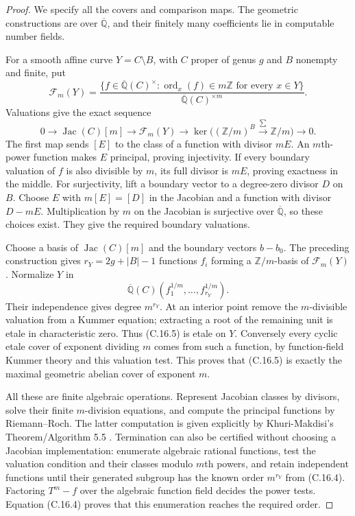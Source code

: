 \begin{proof}
We specify all the covers and comparison maps.
The geometric constructions are over
$\overline{\mathbb Q}$, and their finitely many
coefficients lie in computable number fields.

For a smooth affine curve $Y=C\setminus B$, with $C$
proper of genus $g$ and $B$ nonempty and finite, put
\[
 \mathcal F_m(Y)=
 \frac{\{f\in\overline{\mathbb Q}(C)^\times:
       \operatorname{ord}_x(f)\in m\mathbb Z
                         \text{ for every }x\in Y\}}
      {\overline{\mathbb Q}(C)^{\times m}}.                 \tag{C.16.3}
\]
Valuations give the exact sequence
\[
 0\longrightarrow\operatorname{Jac}(C)[m]
 \longrightarrow\mathcal F_m(Y)
 \longrightarrow
 \ker\bigl((\mathbb Z/m)^B\xrightarrow{\sum}\mathbb Z/m\bigr)
 \longrightarrow0.                                       \tag{C.16.4}
\]
The first map sends $[E]$ to the class of a function
with divisor $mE$.  An $m$th-power function makes
$E$ principal, proving injectivity.  If every boundary
valuation of $f$ is also divisible by $m$, its full
divisor is $mE$, proving exactness in the middle.
For surjectivity, lift a boundary vector to a degree-zero
divisor $D$ on $B$.  Choose $E$ with $m[E]=[D]$ in
the Jacobian and a function with divisor $D-mE$.
Multiplication by $m$ on the Jacobian is surjective
over $\overline{\mathbb Q}$, so these choices exist.
They give the required boundary valuations.

Choose a basis of $\operatorname{Jac}(C)[m]$ and the
boundary vectors $b-b_0$.  The preceding construction
gives $r_Y=2g+|B|-1$ functions $f_i$ forming a
$\mathbb Z/m$-basis of $\mathcal F_m(Y)$.  Normalize
$Y$ in
\[
 \overline{\mathbb Q}(C)
       (f_1^{1/m},\ldots,f_{r_Y}^{1/m}).                    \tag{C.16.5}
\]
Their independence gives degree $m^{r_Y}$.  At an
interior point remove the $m$-divisible valuation
from a Kummer equation; extracting a root of the
remaining unit is etale in characteristic zero.
Thus (C.16.5) is etale on $Y$.  Conversely every
cyclic etale cover of exponent dividing $m$ comes
from such a function, by function-field Kummer
theory and this valuation test.  This proves that
(C.16.5) is exactly the maximal geometric abelian
cover of exponent $m$.

All these are finite algebraic operations.  Represent
Jacobian classes by divisors, solve their finite
$m$-division equations, and compute the principal
functions by Riemann--Roch.  The latter computation
is given explicitly by Khuri-Makdisi's
Theorem/Algorithm 5.5 \cite{BC_KhuriMakdisi2004}.
Termination can also be certified without choosing
a Jacobian implementation: enumerate algebraic
rational functions, test the valuation condition
and their classes modulo $m$th powers, and retain
independent functions until their generated subgroup
has the known order $m^{r_Y}$ from (C.16.4).
Factoring $T^m-f$ over the algebraic function field
decides the power tests.  Equation (C.16.4) proves
that this enumeration reaches the required order.


\end{proof}
